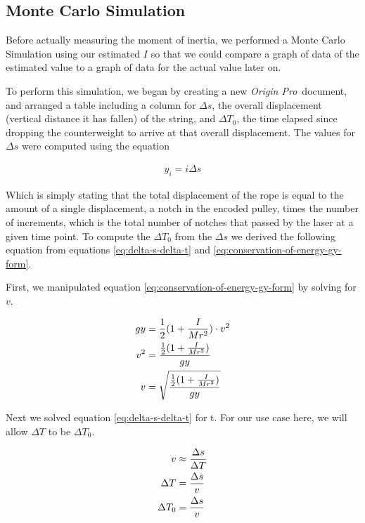 \documentclass[coverpage]{article}
\newcommand{\softwareText}[1]{\textit{#1}\texttrademark}
\newcommand{\origin}{\softwareText{Origin Pro}}
\begin{document}
	\subsection{Monte Carlo Simulation}
	
	Before actually measuring the moment of inertia, we performed a Monte Carlo Simulation using our estimated $I$ so that we could compare a graph of data of the estimated value to a graph of data for the actual value later on.
	
	To perform this simulation, we began by creating a new \origin~document, and arranged a table including a column for $\Delta{s}$, the overall displacement (vertical distance it has fallen) of the string, and $\Delta{T_0}$, the time elapsed since dropping the counterweight to arrive at that overall displacement. The values for $\Delta{s}$ were computed using the equation
	
	\begin{align}
		y_i=i \Delta{s}
	\end{align}

	Which is simply stating that the total displacement of the rope is equal to the amount of a single displacement, a notch in the encoded pulley, times the number of increments, which is the total number of notches that passed by the laser at a given time point. To compute the $\Delta{T_0}$ from the $\Delta{s}$ we derived the following equation from equations \ref{eq:delta-s-delta-t} and \ref{eq:conservation-of-energy-gy-form}.
	
	First, we manipulated equation \ref{eq:conservation-of-energy-gy-form} by solving for $v$.
	
	\begin{align}
		gy&=\frac{1}{2}(1 + \frac{I}{Mr^2}) \cdot v^2 \notag \\
		v^2&=\frac{\frac{1}{2}(1 + \frac{I}{Mr^2})}{gy} \notag \\
		v&=\sqrt{\frac{\frac{1}{2}(1 + \frac{I}{Mr^2})}{gy}} \label{eq:equation-for-v}
	\end{align}
	
	Next we solved equation \ref{eq:delta-s-delta-t} for t. For our use case here, we will allow $\Delta{T}$ to be $\Delta{T_0}$.
	
	\begin{align}
		v&\approx \frac{\Delta{s}}{\Delta{T}} \notag \\
		\Delta{T}&= \frac{\Delta{s}}{v} \notag \\
		\Delta{T_0}&= \frac{\Delta{s}}{v} \label{eq:equation-for-delta-t-0}
	\end{align}
	
\end{document}
